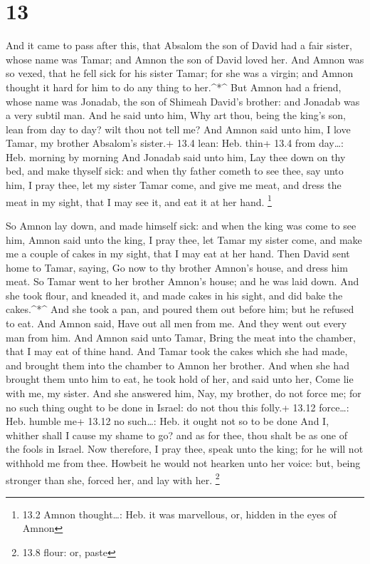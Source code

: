 \hypertarget{section-12}{%
\section{13}\label{section-12}}

 And it came to pass after this, that Absalom the son of
David had a fair sister, whose name was Tamar; and Amnon the son of
David loved her.  And Amnon was so vexed, that he fell sick
for his sister Tamar; for she was a virgin; and Amnon thought it hard
for him to do any thing to her.\^{}*\^{}  But Amnon had a
friend, whose name was Jonadab, the son of Shimeah David's brother: and
Jonadab was a very subtil man.  And he said unto him, Why
art thou, being the king's son, lean from day to day? wilt thou not tell
me? And Amnon said unto him, I love Tamar, my brother Absalom's sister.+
13.4 lean: Heb. thin+ 13.4 from day\ldots: Heb. morning by morning
 And Jonadab said unto him, Lay thee down on thy bed, and
make thyself sick: and when thy father cometh to see thee, say unto him,
I pray thee, let my sister Tamar come, and give me meat, and dress the
meat in my sight, that I may see it, and eat it at her hand. \footnote{13.2
  Amnon thought\ldots: Heb. it was marvellous, or, hidden in the eyes of
  Amnon}

 So Amnon lay down, and made himself sick: and when the king
was come to see him, Amnon said unto the king, I pray thee, let Tamar my
sister come, and make me a couple of cakes in my sight, that I may eat
at her hand.  Then David sent home to Tamar, saying, Go now
to thy brother Amnon's house, and dress him meat.  So Tamar
went to her brother Amnon's house; and he was laid down. And she took
flour, and kneaded it, and made cakes in his sight, and did bake the
cakes.\^{}*\^{}  And she took a pan, and poured them out
before him; but he refused to eat. And Amnon said, Have out all men from
me. And they went out every man from him.  And Amnon said
unto Tamar, Bring the meat into the chamber, that I may eat of thine
hand. And Tamar took the cakes which she had made, and brought them into
the chamber to Amnon her brother.  And when she had brought
them unto him to eat, he took hold of her, and said unto her, Come lie
with me, my sister.  And she answered him, Nay, my brother,
do not force me; for no such thing ought to be done in Israel: do not
thou this folly.+ 13.12 force\ldots: Heb. humble me+ 13.12 no
such\ldots: Heb. it ought not so to be done  And I, whither
shall I cause my shame to go? and as for thee, thou shalt be as one of
the fools in Israel. Now therefore, I pray thee, speak unto the king;
for he will not withhold me from thee.  Howbeit he would
not hearken unto her voice: but, being stronger than she, forced her,
and lay with her. \footnote{13.8 flour: or, paste}

